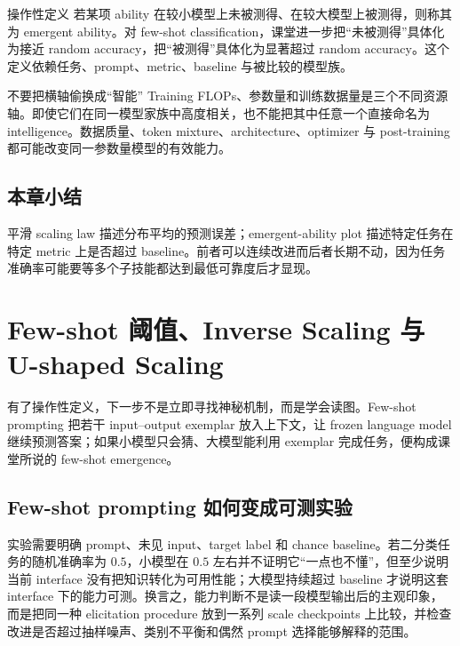 \documentclass[a4paper]{article}
\begin{document}
\begin{importantbox}{操作性定义}
若某项 ability 在较小模型上未被测得、在较大模型上被测得，则称其为 emergent ability。对 few-shot classification，课堂进一步把“未被测得”具体化为接近 random accuracy，把“被测得”具体化为显著超过 random accuracy。这个定义依赖任务、prompt、metric、baseline 与被比较的模型族。
\end{importantbox}

\begin{warningbox}{不要把横轴偷换成“智能”}
Training FLOPs、参数量和训练数据量是三个不同资源轴。即使它们在同一模型家族中高度相关，也不能把其中任意一个直接命名为 intelligence。数据质量、token mixture、architecture、optimizer 与 post-training 都可能改变同一参数量模型的有效能力。
\end{warningbox}

\subsection{本章小结}

平滑 scaling law 描述分布平均的预测误差；emergent-ability plot 描述特定任务在特定 metric 上是否超过 baseline。前者可以连续改进而后者长期不动，因为任务准确率可能要等多个子技能都达到最低可靠度后才显现。

\section{Few-shot 阈值、Inverse Scaling 与 U-shaped Scaling}

有了操作性定义，下一步不是立即寻找神秘机制，而是学会读图。Few-shot prompting 把若干 input--output exemplar 放入上下文，让 frozen language model 继续预测答案；如果小模型只会猜、大模型能利用 exemplar 完成任务，便构成课堂所说的 few-shot emergence。

\subsection{Few-shot prompting 如何变成可测实验}

实验需要明确 prompt、未见 input、target label 和 chance baseline。若二分类任务的随机准确率为 $0.5$，小模型在 $0.5$ 左右并不证明它“一点也不懂”，但至少说明当前 interface 没有把知识转化为可用性能；大模型持续超过 baseline 才说明这套 interface 下的能力可测。换言之，能力判断不是读一段模型输出后的主观印象，而是把同一种 elicitation procedure 放到一系列 scale checkpoints 上比较，并检查改进是否超过抽样噪声、类别不平衡和偶然 prompt 选择能够解释的范围。
\end{document}
